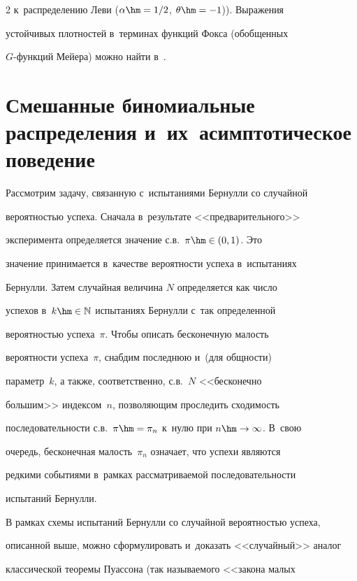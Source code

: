 \begin{multicols}{2}
к~распределению Леви ($\alpha\hm=1/2$, $\theta\hm=-1$)). Выражения


устойчивых плотностей в~терминах функций Фокса (обобщенных


$G$-функ\-ций Мейера) можно найти в~\cite{Schneider1986-k, UchaikinZolotarev1999-k}.





\section{Смешанные биномиальные распределения и~их~асимп\-то\-ти\-чес\-кое поведение}





Рассмотрим задачу, связанную с~испытаниями Бернулли со случайной


вероятностью успеха. Сначала в~результате <<предварительного>>


эксперимента определяется значение с.в.\ $\pi\hm\in(0,1)$. Это


значение принимается в~качестве вероятности успеха в~испытаниях


Бернулли. Затем случайная величина $N$ определяется как число


успехов в~$k\hm\in\mathbb{N}$ испытаниях Бернулли с~так определенной


вероятностью успеха~$\pi$. Чтобы описать бесконечную малость


вероятности успеха~$\pi$, снабдим последнюю и~(для общности)


параметр~$k$, а также, соответственно, с.в.~$N$ <<бесконечно


большим>> индексом~$n$, позволяющим проследить сходимость


последовательности с.в.\ $\pi\hm=\pi_n$ к~нулю при $n\hm\to\infty$. В~свою


очередь, бесконечная малость~$\pi_n$ означает, что успехи являются


редкими событиями в~рамках рассматриваемой последовательности


испытаний Бернулли.





В рамках схемы испытаний Бернулли со случайной вероятностью успеха,


описанной выше, можно сформулировать и~доказать <<случайный>> аналог


классической теоремы Пуассона (так называемого <<закона малых



\end{multicols}
